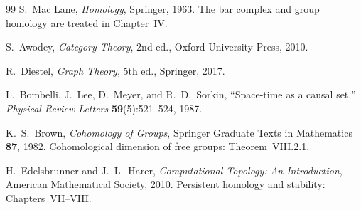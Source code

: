 \documentclass{article}
\theoremstyle{definition}
\theoremstyle{remark}
\begin{document}
\begin{thebibliography}{99}
S.~Mac Lane,
\textit{Homology},
Springer, 1963. The bar complex and group homology are treated
in Chapter~IV.

S.~Awodey,
\textit{Category Theory}, 2nd ed.,
Oxford University Press, 2010.

R.~Diestel,
\textit{Graph Theory}, 5th ed., Springer, 2017.

L.~Bombelli, J.~Lee, D.~Meyer, and R.~D.~Sorkin,
``Space-time as a causal set,''
\textit{Physical Review Letters} \textbf{59}(5):521--524, 1987.

K.~S.~Brown,
\textit{Cohomology of Groups},
Springer Graduate Texts in Mathematics \textbf{87}, 1982.
Cohomological dimension of free groups: Theorem~VIII.2.1.

H.~Edelsbrunner and J.~L.~Harer,
\textit{Computational Topology: An Introduction},
American Mathematical Society, 2010.
Persistent homology and stability: Chapters~VII--VIII.

\end{thebibliography}
\end{document}
